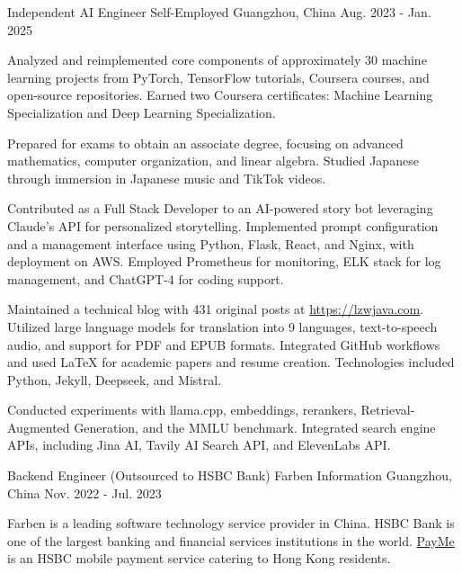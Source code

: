 \begin{cventries}
  \cventry
    {Independent AI Engineer} %
    {Self-Employed} %
    {Guangzhou, China} %
    {Aug. 2023 - Jan. 2025} %
    {
      \begin{cvitems} %
        \item {Analyzed and reimplemented core components of approximately 30 machine learning projects from PyTorch, TensorFlow tutorials, Coursera courses, and open-source repositories. Earned two Coursera certificates: Machine Learning Specialization and Deep Learning Specialization.}
        \item {Prepared for exams to obtain an associate degree, focusing on advanced mathematics, computer organization, and linear algebra. Studied Japanese through immersion in Japanese music and TikTok videos.}
        \item {Contributed as a Full Stack Developer to an AI-powered story bot leveraging Claude's API for personalized storytelling. Implemented prompt configuration and a management interface using Python, Flask, React, and Nginx, with deployment on AWS. Employed Prometheus for monitoring, ELK stack for log management, and ChatGPT-4 for coding support.}
        \item {Maintained a technical blog with 431 original posts at \url{https://lzwjava.com}. Utilized large language models for translation into 9 languages, text-to-speech audio, and support for PDF and EPUB formats. Integrated GitHub workflows and used LaTeX for academic papers and resume creation. Technologies included Python, Jekyll, Deepseek, and Mistral.}
        \item {Conducted experiments with llama.cpp, embeddings, rerankers, Retrieval-Augmented Generation, and the MMLU benchmark. Integrated search engine APIs, including Jina AI, Tavily AI Search API, and ElevenLabs API.}
      \end{cvitems}
    }
  \cventry
    {Backend Engineer (Outsourced to HSBC Bank)} %
    {Farben Information} %
    {Guangzhou, China} %
    {Nov. 2022 - Jul. 2023} %
    {
      \begin{cvitems} %
        \item {Farben is a leading software technology service provider in China. HSBC Bank is one of the largest banking and financial services institutions in the world. \href{https://payme.hsbc.com.hk/}{PayMe} is an HSBC mobile payment service catering to Hong Kong residents.}

\end{cvitems}}
\end{cventries}
